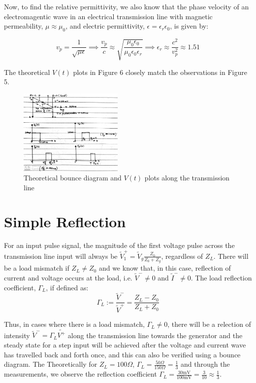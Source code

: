 \documentclass[10pt]{article}
\begin{document}
Now, to find the relative permittivity, we also know that the phase velocity of an electromagentic wave in an electrical transmission line with magnetic permeability, $\mu \approx \mu_0$,
and electric permittivity, $\epsilon = \epsilon_r \epsilon_0$,  is given by: 

\[
    v_p = \frac{1}{\sqrt{\mu \epsilon}} \implies \frac{v_p}{c} \approx 
    \sqrt{\frac{\mu_0\epsilon_0}{\mu_0\epsilon_0\epsilon_r}} \implies 
    \epsilon_r \approx \frac{c^2}{v_p^2} \approx 1.51
\]

The theoretical $V(t)$ plots in Figure 6 closely match the observations in Figure 5.

\begin{figure}[h]
    \centering
    \includegraphics[width=0.45\textwidth]{../photos/lab1/v_t_bounce_no_reflection.jpg}
    \caption{Theoretical bounce diagram and $V(t)$ plots along the transmission line\vspace{-0.5cm}}
    \label{v_t_bounce_no_reflection}
\end{figure}

\section{Simple Reflection}

For an input pulse signal, the magnitude of the first voltage pulse across the transmission line input will always be $\tilde V^+_1 = \tilde V_g\frac{Z_0}{Z_0+Z_g}$, regardless of $Z_L$. There will be a load mismatch if $Z_L \neq Z_0$ and we know that, in this case, reflection of current and
voltage occurs at the load, i.e. $\tilde V^- \neq 0$ and $\tilde I^- \neq 0$. The load reflection coefficient, $\Gamma_L$,
if defined as:
\[
    \Gamma_L := \frac{\tilde V^-}{\tilde V^+} = \frac{Z_L - Z_0}{Z_L + Z_0}
\]

Thus, in cases where there is a load mismatch, $\Gamma_L \neq 0$, there will be a relection of intensity $\tilde V^- = \Gamma_L\tilde{V^+}$ along the 
transmission line towards the generator and the steady state for a step input will be achieved after the voltage and current 
wave has travelled back and forth once, and this can also be verified using a bounce diagram. The Theoretically for $Z_L = 100\Omega$, $\Gamma_L = \frac{50\Omega}{150\Omega} = \frac{1}{3} $ and through the measurements, we observe the reflection 
coefficient $\Gamma_L = \frac{30\text{mV}}{100\text{mV}} = \frac{3}{10} \approx \frac{1}{3}$.
\end{document}
